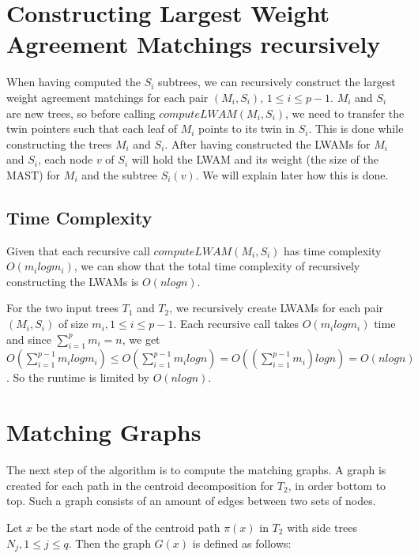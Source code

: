 \section{Constructing Largest Weight Agreement Matchings recursively}
When having computed the $S_i$ subtrees, we can recursively construct the largest weight agreement matchings for each pair $(M_i, S_i)$, $1 \le i \le p-1$. $M_i$ and $S_i$ are new trees, so before calling $computeLWAM(M_i, S_i)$, we need to transfer the twin pointers such that each leaf of $M_i$ points to its twin in $S_i$. This is done while constructing the trees $M_i$ and $S_i$.
After having constructed the LWAMs for $M_i$ and $S_i$, each node $v$ of $S_i$ will hold the LWAM and its weight (the size of the MAST) for $M_i$ and the subtree $S_i(v)$. We will explain later how this is done.

\subsection{Time Complexity}
Given that each recursive call $computeLWAM(M_i, S_i)$ has time complexity $O(m_ilogm_i)$, we can show that the total time complexity of recursively constructing the LWAMs is $O(nlogn)$.

For the two input trees $T_1$ and $T_2$, we recursively create LWAMs for each pair $(M_i, S_i)$ of size $m_i, 1 \le i \le p-1$. Each recursive call takes $O(m_ilogm_i)$ time and since $\sum_{i=1}^p m_i = n$, we get $O(\sum_{i=1}^{p-1} m_ilogm_i) \le O(\sum_{i=1}^{p-1} m_ilogn) = O((\sum_{i=1}^{p-1} m_i)logn) = O(nlogn)$. So the runtime is limited by $O(nlogn)$.

\section{Matching Graphs}
The next step of the algorithm is to compute the matching graphs. A graph is created for each path in the centroid decomposition for $T_2$, in order bottom to top. Such a graph consists of an amount of edges between two sets of nodes.

Let $x$ be the start node of the centroid path $\pi(x)$ in $T_2$ with side trees $N_j, 1 \le j \le q$. Then the graph $G(x)$ is defined as follows:

